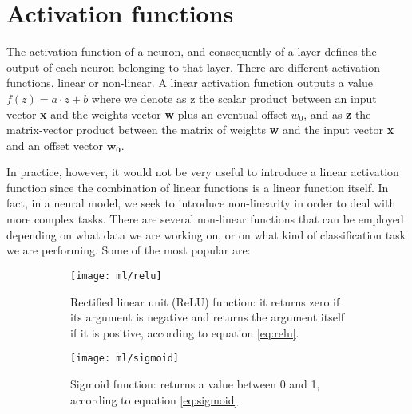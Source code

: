 \documentclass[11pt]{report}
\begin{document}
\section{Activation functions}\label{sec:activation_functions}
The activation function of a neuron, and consequently of a layer defines the output of each neuron belonging to that layer.
There are different activation functions, linear or non-linear.
A linear activation function outputs a value $f(z) = a \cdot z + b$ where we denote as z the scalar product between an input vector \textbf{x} and the weights vector \textbf{w} plus an eventual offset $w_0$, and as \textbf{z} the matrix-vector product between the matrix of weights \textbf{w} and the input vector \textbf{x} and an offset vector $\mathbf{w_0}$.

In practice, however, it would not be very useful to introduce a linear activation function since the combination of linear functions is a linear function itself.
In fact, in a neural model, we seek to introduce non-linearity in order to deal with more complex tasks.
There are several non-linear functions that can be employed depending on what data we are working on, or on what kind of classification task we are performing.
Some of the most popular are:


\begin{figure}
\centering
\begin{subfigure}{0.4\textwidth}
\texttt{[image: ml/relu]}
\caption{Rectified linear unit (ReLU) function: it returns zero if its argument is negative and returns the argument itself if it is positive, according to equation \ref{eq:relu}.}
\label{fig:relu_example}
\end{subfigure}
\begin{subfigure}{0.4\textwidth}
\texttt{[image: ml/sigmoid]}
\caption{Sigmoid function: returns a value between 0 and 1, according to equation \ref{eq:sigmoid}}
\label{fig:sigmoid_example}
\end{subfigure}
\caption{}
\end{figure}
\end{document}
